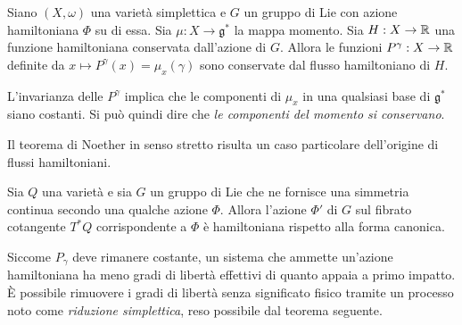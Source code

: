 \begin{theorem}
  Siano $(X,\omega)$ una varietà simplettica e $G$ un gruppo di Lie con azione hamiltoniana $\Phi$ su di essa. Sia $\mu: X\to \mathfrak{g}^*$ la mappa momento. Sia $H: X\to \mathbb{R}$ una funzione hamiltoniana conservata dall'azione di $G$. Allora le funzioni $P^{\gamma}: X\to \mathbb{R}$ definite da $x \mapsto P^{\gamma}(x) = \mu_x(\gamma)$ sono conservate dal flusso hamiltoniano di $H$.
\end{theorem}
\begin{remark}
  L'invarianza delle $P^{\gamma}$ implica che le componenti di $\mu_x$ in una qualsiasi base di $\mathfrak{g}^*$ siano costanti. Si può quindi dire che \emph{le componenti del momento si conservano}. 
\end{remark}

Il teorema di Noether in senso stretto risulta un caso particolare dell'origine di flussi hamiltoniani.
\begin{theorem}
  Sia $Q$ una varietà e sia $G$ un gruppo di Lie che ne fornisce una simmetria continua secondo una qualche azione $\Phi$. Allora l'azione $\Phi'$ di $G$ sul fibrato cotangente $T^*Q$ corrispondente a $\Phi$ è hamiltoniana rispetto alla forma canonica.
\end{theorem}

Siccome $P_\gamma$ deve rimanere costante, un sistema che ammette un'azione hamiltoniana ha meno gradi di libertà effettivi di quanto appaia a primo impatto. È possibile rimuovere i gradi di libertà senza significato fisico tramite un processo noto come \emph{riduzione simplettica}, reso possibile dal teorema seguente.

